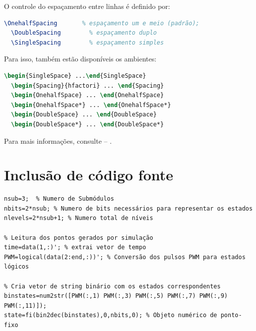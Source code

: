 O controle do espaçamento entre linhas é
definido por:

\begin{lstlisting}[language=tex]
  \OnehalfSpacing       % espaçamento um e meio (padrão);
  \DoubleSpacing        % espaçamento duplo
  \SingleSpacing        % espaçamento simples
\end{lstlisting}

Para isso, também estão disponíveis os ambientes:

\begin{lstlisting}[language=tex]
  \begin{SingleSpace} ...\end{SingleSpace}
  \begin{Spacing}{hfactori} ... \end{Spacing}
  \begin{OnehalfSpace} ... \end{OnehalfSpace}
  \begin{OnehalfSpace*} ... \end{OnehalfSpace*}
  \begin{DoubleSpace} ... \end{DoubleSpace}
  \begin{DoubleSpace*} ... \end{DoubleSpace*}
\end{lstlisting}

Para mais informações, consulte \textcite[p. 47-52 e 135]{memoir} -- \showfont.

\section{Inclusão de código fonte}\label{sec-codeinsert}

\begin{lstlisting}[caption={[Leitura dos dados simulados e conversão para
estados topológicos.]{Leitura dos dados simulados e conversão para estados
topológicos. -- \showfont}},label={lst:leituradadossim}]
% Pré definições iniciais
nsub=3;  % Numero de Submódulos
nbits=2*nsub; % Numero de bits necessários para representar os estados
nlevels=2*nsub+1; % Numero total de níveis

% Leitura dos pontos gerados por simulação
time=data(1,:)'; % extrai vetor de tempo
PWM=logical(data(2:end,:))'; % Conversão dos pulsos PWM para estados lógicos

% Cria vetor de string binário com os estados correspondentes
binstates=num2str([PWM(:,1) PWM(:,3) PWM(:,5) PWM(:,7) PWM(:,9) PWM(:,11)]);
state=fi(bin2dec(binstates),0,nbits,0); % Objeto numérico de ponto-fixo

\end{lstlisting}

